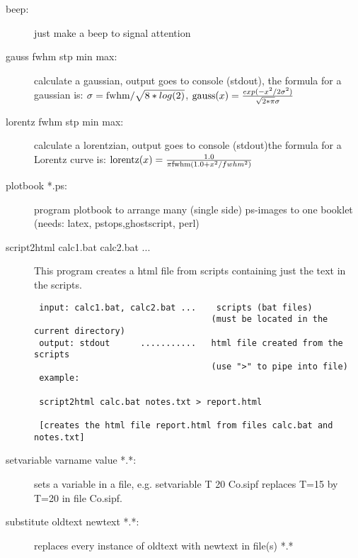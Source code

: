 \begin{description}
\item [\prg beep:] just make a beep to signal attention 
\item [\prg gauss fwhm stp min max:] calculate a gaussian, output goes to console %
(stdout), the formula for a gaussian is:
$\sigma={\rm fwhm}/\sqrt{8*log(2)}$,
${\rm gauss}(x)=\frac{exp(-x^2/2 \sigma^2)}{\sqrt{2*\pi}\sigma}$
\item [\prg lorentz fwhm stp min max:] calculate a lorentzian, output goes to %
console (stdout)the formula for a Lorentz curve is: 
${\rm lorentz}(x)=\frac{1.0}{\pi{\rm fwhm}(1.0+x^2/fwhm^2)}$
\item [\prg plotbook *.ps:] program plotbook to arrange many (single side) ps-images to one %
booklet (needs: latex, pstops,ghostscript, perl)
\item [\prg script2html calc1.bat calc2.bat ...] This program creates a html file from scripts containing just the text
 in the scripts.
\begin{verbatim}
 input: calc1.bat, calc2.bat ...    scripts (bat files)
                                   (must be located in the current directory)
 output: stdout      ...........   html file created from the scripts
                                   (use ">" to pipe into file)
 example:

 script2html calc.bat notes.txt > report.html

 [creates the html file report.html from files calc.bat and notes.txt]
\end{verbatim}
\item [\prg setvariable varname value *.*:]
sets a variable in a file, e.g. {\prg setvariable T 20 Co.sipf} replaces
T=15 by T=20 in file {\prg Co.sipf}.
\item [\prg substitute oldtext newtext *.*:] replaces every instance of %
oldtext with newtext in file(s) *.*
\end{description}


